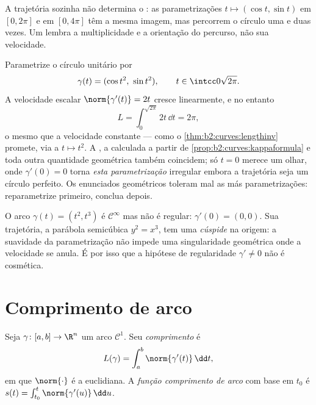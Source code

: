 \begin{remark}
A trajetória sozinha não determina o : as
parametrizações $t \mapsto (\cos t, \sin t)$ em $[0, 2\pi]$ e em
$[0, 4\pi]$ têm a mesma imagem, mas percorrem o círculo uma e
duas vezes. Um  lembra a multiplicidade e a orientação
do percurso, não sua velocidade.
\end{remark}

\begin{example}\label{ex:b2:curves:speedinvariance}
Parametrize o círculo unitário por
\[
\gamma(t) = (\cos t^2,\ \sin t^2),
\qquad t \in \intcc0{\sqrt{2\pi}} .
\]
A velocidade escalar $\norm{\gamma'(t)} = 2t$ cresce linearmente, e no entanto
\[
L = \int_0^{\sqrt{2\pi}}2t\,\dd t = 2\pi ,
\]
o mesmo  que a velocidade constante --- como o
\cref{thm:b2:curves:lengthinv} promete, via a  $t \mapsto t^2$. A , a 
calculada a partir de \cref{prop:b2:curves:kappaformula} e toda
outra quantidade geométrica também coincidem; só $t = 0$
merece um olhar, onde $\gamma'(0) = 0$ torna \emph{esta
parametrização} irregular embora a trajetória seja um
círculo perfeito. Os enunciados geométricos toleram mal as más
parametrizações: reparametrize primeiro, conclua
depois.
\end{example}

\begin{example}\label{ex:b2:curves:cusp}
O arco $\gamma(t) = (t^2, t^3)$ é $\mathcal{C}^\infty$ mas não é
regular: $\gamma'(0) = (0, 0)$. Sua trajetória, a parábola
semicúbica $y^2 = x^3$, tem uma \emph{cúspide} na origem: a suavidade
da parametrização não impede uma singularidade geométrica
onde a velocidade se anula. É por isso que a hipótese de regularidade
$\gamma' \neq 0$ não é cosmética.
\end{example}

\section{Comprimento de arco}

\begin{definition}\label{def:b2:curves:length}
Seja $\gamma \colon [a, b] \to \R^n$ um arco $\mathcal{C}^1$. Seu
\emph{comprimento} é
\[
L(\gamma) = \int_a^b \norm{\gamma'(t)}\, \dd t ,
\]
em que $\norm{\cdot}$ é a  euclidiana. A \emph{função comprimento
de arco} com base em $t_0$ é $s(t) = \int_{t_0}^t
\norm{\gamma'(u)}\,\dd u$.
\end{definition}

